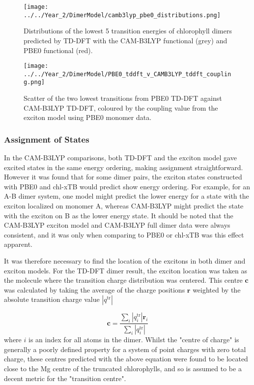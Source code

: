 \begin{figure}
    \centering
    \texttt{[image: ../../Year\_2/DimerModel/camb3lyp\_pbe0\_distributions.png]}
    \caption{Distributions of the lowest 5 transition energies of chlorophyll dimers 
    predicted by TD-DFT with the CAM-B3LYP functional (grey) and PBE0 functional (red).}
    \label{fig:camb3lyp_pbe0_distributions}
\end{figure}

\begin{figure}
    \centering
    \texttt{[image: ../../Year\_2/DimerModel/PBE0\_tddft\_v\_CAMB3LYP\_tddft\_coupling.png]}
    \caption{Scatter of the two lowest transitions from PBE0 TD-DFT against CAM-B3LYP
    TD-DFT, coloured by the coupling value from the exciton model using PBE0 monomer 
    data.}
    \label{fig:pbe0_camb3lyp_coupling}
\end{figure}

\afterpartskip
\subsubsection{Assignment of States}
\label{subsec:state_assign}

In the CAM-B3LYP comparisons, both TD-DFT and the exciton model gave excited states
in the same energy ordering, making assignment straightforward. However it was found
that for some dimer pairs, the exciton states constructed with PBE0 and chl-xTB
would predict show energy ordering. For example, for an A-B  dimer system,
one model might predict the lower energy for a state with the exciton localized 
on monomer A, whereas CAM-B3LYP might predict the state with the exciton on B as
the lower energy state. It should be noted that the CAM-B3LYP exciton model and CAM-B3LYP 
full dimer data were always consistent, and it was only when comparing to PBE0 or
chl-xTB was this effect apparent.

It was therefore necessary to find the location of the excitons in both dimer and
exciton models. For the TD-DFT dimer result, the exciton location was taken as the
molecule where the transition charge distribution was centered. This centre $\mathbf{c}$
was calculated by taking the average of the charge positions $\mathbf{r}$ weighted
by the absolute transition charge value $\left\lvert q^{\text{tr}} \right\rvert$

\begin{equation}
    \mathbf{c} = \frac{\sum_i \left\lvert q^{\text{tr}}_i \right\rvert \mathbf{r}_i}{\sum_i \left\lvert q^{\text{tr}}_i \right\rvert}
\end{equation}
%
where $i$ is an index for all atoms in the dimer. Whilst the "centre of charge"
is generally a poorly defined property for a system of point charges with zero total
charge, these centres predicted with the above equation were found to be located close
to the Mg centre of the truncated chlorophylls, and so is assumed to be a decent
metric for the "transition centre".

